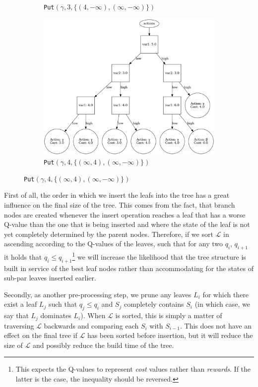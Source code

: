 \documentclass{article}
\begin{document}
\begin{figure}[H]
\begin{subfigure}[t]{0.55\textwidth}
        \captionsetup{labelformat=empty}
        \caption{%
            \texttt{Put}$(\gamma, 3, \{(4, -\infty),(\infty,-\infty)\})$
        }
    \end{subfigure}
    \begin{subfigure}[t]{0.55\textwidth}
        \centering
        \includegraphics[width=.9\textwidth]{exampleBuild6}
        \captionsetup{labelformat=empty}
        \caption{%
            \texttt{Put}$(\gamma, 4, \{(\infty, 4),(\infty,-\infty)\})$
        }
    \end{subfigure}
\end{figure}

First of all, the order in which we insert the leafs into the tree has a great
influence on the final size of the tree. This comes from the fact, that branch
nodes are created whenever the insert operation reaches a leaf that has a worse
Q-value than the one that is being inserted and where the state of the leaf is
not yet completely determined by the parent nodes. Therefore, if we sort
$\mathcal{L}$ in ascending according to the Q-values of the leaves, such that
for any two $q_i$, $q_{i+1}$ it holds that $q_i \leq q_{i+1}$\footnote{%
    This expects the Q-values to represent \textit{cost} values rather than
    \textit{rewards}. If the latter is the case, the inequality should be
    reversed.
} we will increase the likelihood that the tree structure is built in
service of the best leaf nodes rather than accommodating for the states of
sub-par leaves inserted earlier.

Secondly, as another pre-processing step, we prune any leaves $L_i$ for which
there exist a leaf $L_j$ such that $q_j \leq q_i$ and $S_j$ completely contains
$S_i$ (in which case, we say that $L_j$ dominates $L_i$). When $\mathcal{L}$ is
sorted, this is simply a matter of traversing $\mathcal{L}$ backwards and
comparing each $S_{i}$ with $S_{i-1}$. This does not have an effect on the final
tree if $\mathcal{L}$ has been sorted before insertion, but it will reduce the
size of $\mathcal{L}$ and possibly reduce the build time of the tree.
\end{document}
